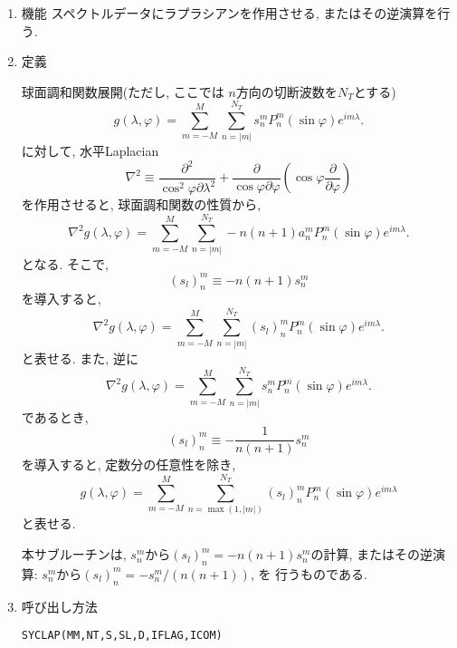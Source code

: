 \documentclass[a4j]{jsarticle}
\begin{document}
\begin{enumerate}

\item 機能 
スペクトルデータにラプラシアンを作用させる, またはその逆演算を行う.

\item 定義

球面調和関数展開(ただし, ここでは $n$方向の切断波数を$N_T$とする)
\begin{equation}
g(\lambda,\varphi)=\sum^M_{m=-M}\sum^{N_T}_{n=|m|}
s^m_nP^m_n(\sin\varphi)e^{im\lambda}.
\end{equation}
に対して, 水平Laplacian
\begin{equation}
\nabla^2\equiv
\frac{\partial^2}{\cos^2\varphi\partial\lambda^2}
+\frac{\partial}{\cos\varphi\partial\varphi}\left(\cos\varphi\frac{\partial}{\partial\varphi}\right)
\end{equation}
を作用させると, 球面調和関数の性質から, 
\begin{equation}
\nabla^2 g(\lambda,\varphi)
=\sum^M_{m=-M}\sum^{N_T}_{n=|m|}-n(n+1)a^m_nP^m_n(\sin\varphi)e^{im\lambda}.
\end{equation}
となる. そこで,
\begin{equation}
(s_l)^m_n\equiv -n(n+1)s^m_n
\end{equation}
を導入すると, 
\begin{equation}
\nabla^2 g(\lambda,\varphi)
=\sum^M_{m=-M}\sum^{N_T}_{n=|m|}(s_l)^m_nP^m_n(\sin\varphi)e^{im\lambda}.
\end{equation}
と表せる. 
また, 逆に
\begin{equation}
\nabla^2 g(\lambda,\varphi)
=\sum^M_{m=-M}\sum^{N_T}_{n=|m|}s^m_nP^m_n(\sin\varphi)e^{im\lambda}.
\end{equation}
であるとき, 
\begin{equation}
(s_l)^m_n\equiv -\frac1{n(n+1)}s^m_n
\end{equation}
を導入すると, 定数分の任意性を除き,
\begin{equation}
g(\lambda,\varphi)
=\sum^M_{m=-M}\sum^{N_T}_{n=\max(1,|m|)}
(s_l)^m_nP^m_n(\sin\varphi)e^{im\lambda}
\end{equation}
と表せる. 

本サブルーチンは,
$s^m_n$から$(s_l)^m_n = -n(n+1)s^m_n$の計算, 
またはその逆演算: $s^m_n$から$(s_l)^m_n = -s^m_n/(n(n+1))$, を
行うものである. 

\item 呼び出し方法 
    
\texttt{SYCLAP(MM,NT,S,SL,D,IFLAG,ICOM)}
  

\end{enumerate}
\end{document}
